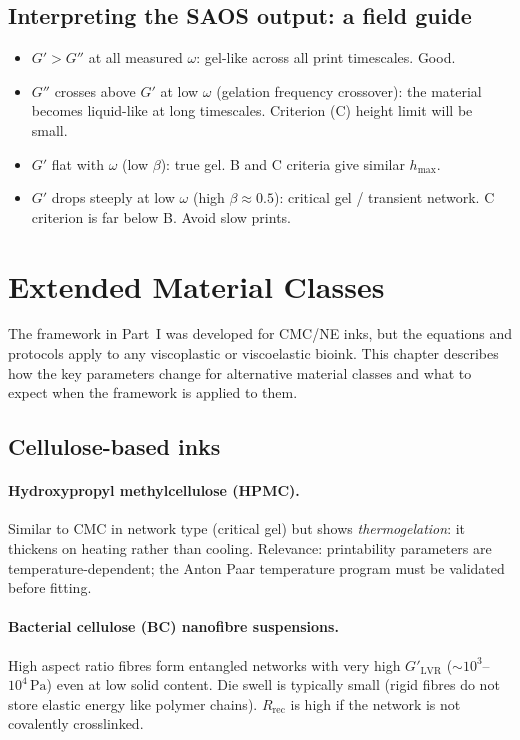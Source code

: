\documentclass[11pt,a4paper]{article}
\begin{document}
\subsection{Interpreting the SAOS output: a field guide}

\begin{itemize}[leftmargin=1.6em,itemsep=2pt]
\item $G'>G''$ at all measured $\omega$: gel-like across all print
  timescales. Good.
\item $G''$ crosses above $G'$ at low $\omega$ (gelation frequency
  crossover): the material becomes liquid-like at long timescales.
  Criterion (C) height limit will be small.
\item $G'$ flat with $\omega$ (low $\beta$): true gel. B and C
  criteria give similar $h_\mathrm{max}$.
\item $G'$ drops steeply at low $\omega$ (high $\beta\approx 0.5$):
  critical gel / transient network. C criterion is far below B.
  Avoid slow prints.
\end{itemize}

\section{Extended Material Classes}
\label{sec:materials}

The framework in Part~I was developed for CMC/NE inks, but the equations
and protocols apply to any viscoplastic or viscoelastic bioink. This
chapter describes how the key parameters change for alternative material
classes and what to expect when the framework is applied to them.

\subsection{Cellulose-based inks}

\paragraph{Hydroxypropyl methylcellulose (HPMC).} Similar to CMC in
network type (critical gel) but shows \emph{thermogelation}: it
thickens on heating rather than cooling. Relevance: printability
parameters are temperature-dependent; the Anton Paar temperature program
must be validated before fitting.

\paragraph{Bacterial cellulose (BC) nanofibre suspensions.} High aspect
ratio fibres form entangled networks with very high $G'_\mathrm{LVR}$
($\sim 10^3$--$10^4\,\si{\Pa}$) even at low solid content. Die swell
is typically small (rigid fibres do not store elastic energy like polymer
chains). $R_\mathrm{rec}$ is high if the network is not covalently
crosslinked.
\end{document}
